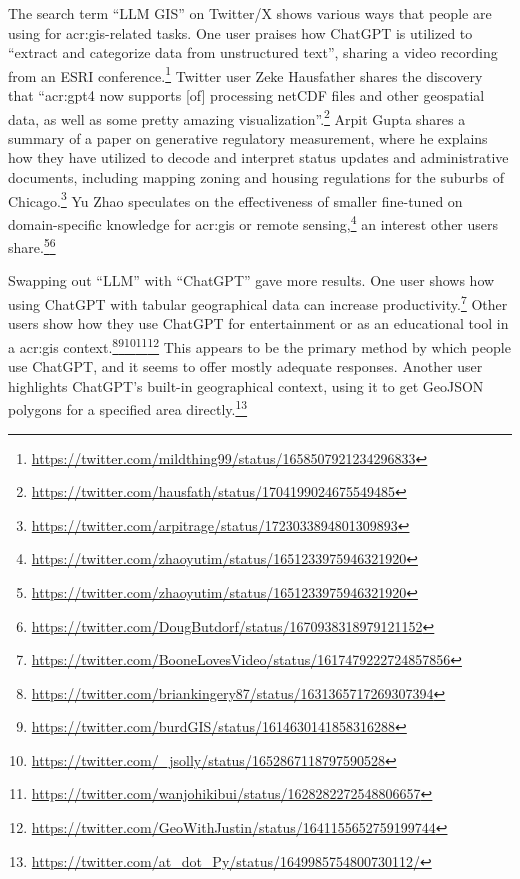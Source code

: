 The search term \enquote{LLM GIS} on Twitter/X shows various ways that people are using  for \acrshort{acr:gis}-related tasks. One user praises how ChatGPT is utilized to \enquote{extract and categorize data from unstructured text}, sharing a video recording from an ESRI conference.\footnote{\url{https://twitter.com/mildthing99/status/1658507921234296833}} Twitter user Zeke Hausfather shares the discovery that \enquote{\acrshort{acr:gpt}4 now supports [of] processing netCDF files and other geospatial data, as well as some pretty amazing visualization}.\footnote{\url{https://twitter.com/hausfath/status/1704199024675549485}} Arpit Gupta shares a summary of a paper on generative regulatory measurement, where he explains how they have utilized  to decode and interpret status updates and administrative documents, including mapping zoning and housing regulations for the suburbs of Chicago.\footnote{\url{https://twitter.com/arpitrage/status/1723033894801309893}} Yu Zhao speculates on the effectiveness of smaller  fine-tuned on domain-specific knowledge for \acrshort{acr:gis} or remote sensing,\footnote{\url{https://twitter.com/zhaoyutim/status/1651233975946321920}} an interest other users share.\footnote{\url{https://twitter.com/zhaoyutim/status/1651233975946321920}}\footnote{\url{https://twitter.com/DougButdorf/status/1670938318979121152}}

Swapping out \enquote{LLM} with \enquote{ChatGPT} gave more results. One user shows how using ChatGPT with tabular geographical data can increase productivity.\footnote{\url{https://twitter.com/BooneLovesVideo/status/1617479222724857856}} Other users show how they use ChatGPT for entertainment or as an educational tool in a \acrshort{acr:gis} context.\footnote{\url{https://twitter.com/briankingery87/status/1631365717269307394}}\footnote{\url{https://twitter.com/burdGIS/status/1614630141858316288}}\footnote{\url{https://twitter.com/_jsolly/status/1652867118797590528}}\footnote{\url{https://twitter.com/wanjohikibui/status/1628282272548806657}}\footnote{\url{https://twitter.com/GeoWithJustin/status/1641155652759199744}} This appears to be the primary method by which people use ChatGPT, and it seems to offer mostly adequate responses. Another user highlights ChatGPT's built-in geographical context, using it to get GeoJSON polygons for a specified area directly.\footnote{\url{https://twitter.com/at_dot_Py/status/1649985754800730112/}}

